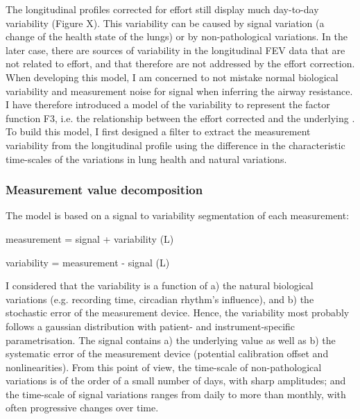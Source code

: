 The longitudinal profiles corrected for effort still display much day-to-day variability (Figure X). This variability can be caused by signal variation (a change of the health state of the lungs) or by non-pathological variations. In the later case, there are sources of variability in the longitudinal FEV data that are not related to effort, and that therefore are not addressed by the effort correction. When developing this model, I am concerned to not mistake normal biological variability and measurement noise for signal when inferring the airway resistance. I have therefore introduced a model of the \F variability to represent the factor function F3, i.e. the relationship between the effort corrected \F and the underlying \F. To build this model, I first designed a filter to extract the measurement variability from the longitudinal profile using the difference in the characteristic time-scales of the variations in lung health and natural variations.

\subsubsection{Measurement value decomposition}
The model is based on a signal to variability segmentation of each measurement:
\begin{center}
    measurement = signal + variability (L)
\end{center}
\begin{center}
    variability = measurement - signal (L)
\end{center}
I considered that the variability is a function of a) the natural biological variations (e.g. recording time, circadian rhythm’s influence), and b) the stochastic error of the measurement device. Hence, the variability most probably follows a gaussian distribution with patient- and instrument-specific parametrisation. The signal contains a) the underlying \F value as well as b) the systematic error of the measurement device (potential calibration offset and nonlinearities). From this point of view, the time-scale of non-pathological variations is of the order of a small number of days, with sharp amplitudes; and the time-scale of signal variations ranges from daily to more than monthly, with often progressive changes over time.

